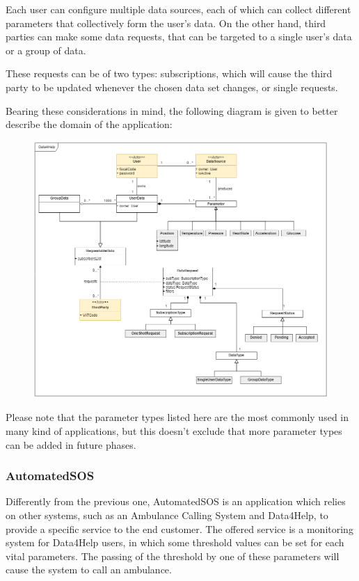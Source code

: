 Each user can configure multiple data sources, each of which can collect different parameters that collectively form the user's data. On the other hand, third parties can make some data requests, that can be targeted to a single user's data or a group of data.

These requests can be of two types: subscriptions, which will cause the third party to be updated whenever the chosen data set changes, or single requests.

Bearing these considerations in mind, the following diagram is given to better describe the domain of the application:

\begin{figure}[h!]
	\centering
	\includegraphics[width = \linewidth] {../Diagrams/ClassDiagram-General.png}\\[1.0 cm]
\end{figure}

Please note that the parameter types listed here are the most commonly used in many kind of applications, but this doesn't exclude that more parameter types can be added in future phases.
\newpage

\subsubsection{AutomatedSOS}
Differently from the previous one, AutomatedSOS is an application which relies on other systems, such as an Ambulance Calling System and Data4Help, to provide a specific service to the end customer. 
The offered service is a monitoring system for Data4Help users, in which some threshold values can be set for each vital parameters. The passing of the threshold by one of these parameters will cause the system to call an ambulance.

